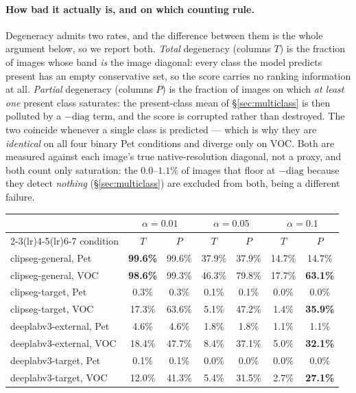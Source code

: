 \documentclass[11pt]{article}
\theoremstyle{remark}
\newcommand{\diag}{\mathrm{diag}}
\begin{document}
\paragraph{How bad it actually is, and on which counting rule.} Degeneracy admits
two rates, and the difference between them is the whole argument below, so we
report both. \emph{Total} degeneracy (columns $T$) is the fraction of images whose
band \emph{is} the image diagonal: every class the model predicts present has an
empty conservative set, so the score carries no ranking information at all.
\emph{Partial} degeneracy (columns $P$) is the fraction of images on which
\emph{at least one} present class saturates: the present-class mean of
\S\ref{sec:multiclass} is then polluted by a $-\diag$ term, and the score is
corrupted rather than destroyed. The two coincide whenever a single class is
predicted --- which is why they are \emph{identical} on all four binary Pet
conditions and diverge only on VOC. Both are measured against each image's true
native-resolution diagonal, not a proxy, and both count only saturation: the
$0.0$--$1.1\%$ of images that floor at $-\diag$ because they detect \emph{nothing}
(\S\ref{sec:multiclass}) are excluded from both, being a different failure.

\begin{center}
\small
\begin{tabular}{lcccccc}
\toprule
& \multicolumn{2}{c}{$\alpha=0.01$} & \multicolumn{2}{c}{$\alpha=0.05$}
& \multicolumn{2}{c}{$\alpha=0.1$} \\
\cmidrule(lr){2-3}\cmidrule(lr){4-5}\cmidrule(lr){6-7}
condition & $T$ & $P$ & $T$ & $P$ & $T$ & $P$ \\
\midrule
clipseg-general, Pet    & \textbf{99.6\%} & 99.6\% & 37.9\% & 37.9\% & 14.7\% & 14.7\% \\
clipseg-general, VOC    & \textbf{98.6\%} & 99.3\% & 46.3\% & 79.8\% & 17.7\% & \textbf{63.1\%} \\
clipseg-target, Pet     & 0.3\% & 0.3\% & 0.1\% & 0.1\% & 0.0\% & 0.0\% \\
clipseg-target, VOC     & 17.3\% & 63.6\% & 5.1\% & 47.2\% & 1.4\% & \textbf{35.9\%} \\
deeplabv3-external, Pet & 4.6\% & 4.6\% & 1.8\% & 1.8\% & 1.1\% & 1.1\% \\
deeplabv3-external, VOC & 18.4\% & 47.7\% & 8.4\% & 37.1\% & 5.0\% & \textbf{32.1\%} \\
deeplabv3-target, Pet   & 0.1\% & 0.1\% & 0.0\% & 0.0\% & 0.0\% & 0.0\% \\
deeplabv3-target, VOC   & 12.0\% & 41.3\% & 5.4\% & 31.5\% & 2.7\% & \textbf{27.1\%} \\
\bottomrule
\end{tabular}
\end{center}
\end{document}

